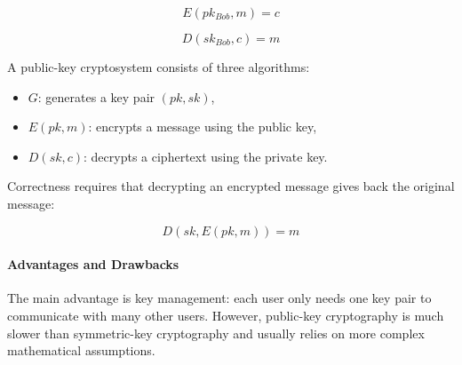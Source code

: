 \[
E(pk_{Bob}, m) = c
\]

\[
D(sk_{Bob}, c) = m
\]

A public-key cryptosystem consists of three algorithms:

\begin{itemize}
    \item $G$: generates a key pair $(pk, sk)$,
    \item $E(pk,m)$: encrypts a message using the public key,
    \item $D(sk,c)$: decrypts a ciphertext using the private key.
\end{itemize}

Correctness requires that decrypting an encrypted message gives back the
original message:

\[
D(sk, E(pk,m)) = m
\]

\paragraph{Advantages and Drawbacks}

The main advantage is key management: each user only needs one key pair
to communicate with many other users. However, public-key cryptography is
much slower than symmetric-key cryptography and usually relies on more
complex mathematical assumptions.

